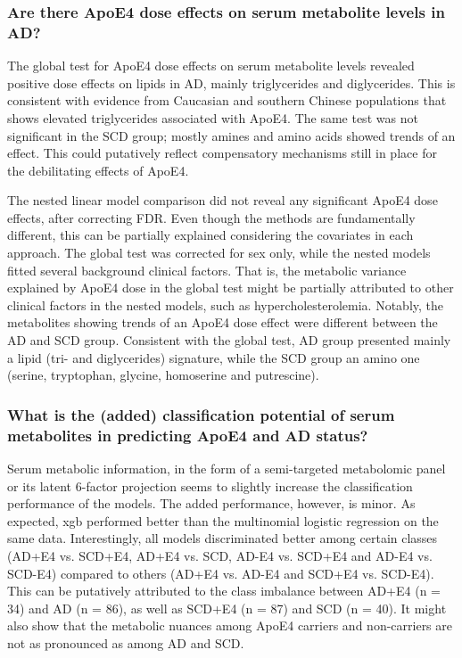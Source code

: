 \documentclass{amsart}
\begin{document}
\subsubsection{Are there ApoE4 dose effects on serum metabolite levels in AD?}
The global test for ApoE4 dose effects on serum metabolite levels revealed positive dose effects on lipids in AD, mainly triglycerides and diglycerides. This is consistent with evidence from Caucasian \cite{Maxwell2013APOEMT,CARVALHOWELLS20121447,Bernath2020SerumTI} and southern Chinese populations \cite{Gan2022EffectsPopulation} that shows elevated triglycerides associated with ApoE4. The same test was not significant in the SCD group; mostly amines and amino acids showed trends of an effect. This could putatively reflect compensatory mechanisms still in place for the debilitating effects of ApoE4.

The nested linear model comparison did not reveal any significant ApoE4 dose effects, after correcting FDR. Even though the methods are fundamentally different, this can be partially explained considering the covariates in each approach. The global test was corrected for sex only, while the nested models fitted several background clinical factors. That is, the metabolic variance explained by ApoE4 dose in the global test might be partially attributed to other clinical factors in the nested models, such as hypercholesterolemia. Notably, the metabolites showing trends of an ApoE4 dose effect were different between the AD and SCD group. Consistent with the global test, AD group presented mainly a lipid (tri- and diglycerides) signature, while the SCD group an amino one (serine, tryptophan, glycine, homoserine and putrescine).

\subsubsection{What is the (added) classification potential of serum metabolites in predicting ApoE4 and AD
status?}
Serum metabolic information, in the form of a semi-targeted metabolomic panel or its latent 6-factor projection seems to slightly increase the classification performance of the models. The added performance, however, is minor. As expected, \acrshort{xgb} performed better than the multinomial logistic regression on the same data. Interestingly, all models discriminated better among certain classes (AD+E4 vs. SCD+E4, AD+E4 vs. SCD, AD-E4 vs. SCD+E4 and AD-E4 vs. SCD-E4) compared to others (AD+E4 vs. AD-E4 and SCD+E4 vs. SCD-E4). This can be putatively attributed to the class imbalance between AD+E4 (n = 34) and AD (n = 86), as well as SCD+E4 (n = 87) and SCD (n = 40). It might also show that the metabolic nuances among ApoE4 carriers and non-carriers are not as pronounced as among AD and SCD.
\end{document}
